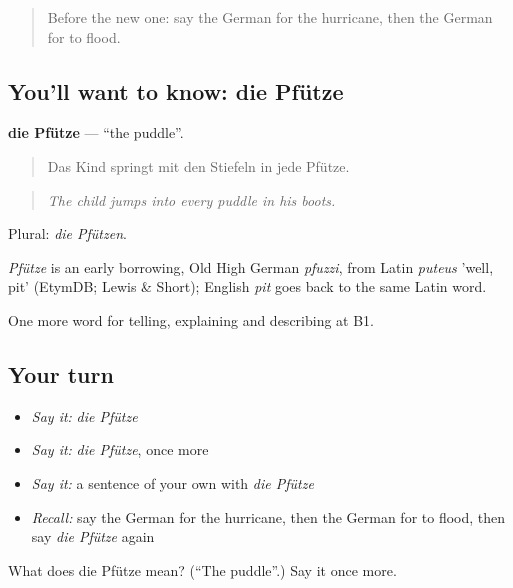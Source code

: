 \label{lesson:GE-C465-pfuetze}



\begin{quote}
Before the new one: say the German for the hurricane, then the German for to flood.
\end{quote}

\subsection*{You'll want to know: die Pfütze}
\textbf{die Pfütze} — \textquotedblleft{}the puddle\textquotedblright{}.

\begin{quote}
Das Kind springt mit den Stiefeln in jede Pfütze.
\end{quote}

\begin{quote}
\emph{The child jumps into every puddle in his boots.}
\end{quote}

Plural: \emph{die Pfützen}.

\begin{cousinweb}
\emph{Pfütze} is an early borrowing, Old High German \emph{pfuzzi}, from Latin \emph{puteus} 'well, pit' (EtymDB; Lewis \& Short); English \emph{pit} goes back to the same Latin word.
\end{cousinweb}

\begin{grammarlens}[title={What you've built}]
One more word for telling, explaining and describing at B1.
\end{grammarlens}

\subsection*{Your turn}
\begin{itemize}
\raggedright
  \item \emph{Say it:} \emph{die Pfütze}
  \item \emph{Say it:} \emph{die Pfütze}, once more
  \item \emph{Say it:} a sentence of your own with \emph{die Pfütze}
  \item \emph{Recall:} say the German for the hurricane, then the German for to flood, then say \emph{die Pfütze} again
\end{itemize}

\begin{tcolorbox}[breakable,colback=teal!4,colframe=teal!35!black,title={Before you move on}]
What does die Pfütze mean? (\textquotedblleft{}The puddle\textquotedblright{}.) Say it once more.
\end{tcolorbox}
